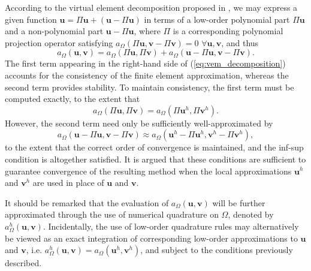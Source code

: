 	According to the virtual element decomposition proposed in \cite{Veiga:13}, we may express a given function $\mathbf{u} = \Pi \mathbf{u} + (\mathbf{u} - \Pi \mathbf{u})$ in terms of a low-order polynomial part $\Pi \mathbf{u}$ and a non-polynomial part $\mathbf{u} - \Pi \mathbf{u}$, where $\Pi$ is a corresponding polynomial projection operator satisfying $a_{\Omega}(\Pi \mathbf{u},\mathbf{v} - \Pi \mathbf{v}) = 0 \, \, \forall \mathbf{u}, \mathbf{v}$, and thus
	\begin{equation}
		a_{\Omega}(\mathbf{u},\mathbf{v}) = a_{\Omega}(\Pi \mathbf{u},\Pi \mathbf{v}) + a_{\Omega}(\mathbf{u} - \Pi \mathbf{u},\mathbf{v} - \Pi \mathbf{v}).
		\label{eq:vem_decomposition}
	\end{equation}
	The first term appearing in the right-hand side of (\ref{eq:vem_decomposition}) accounts for the consistency of the finite element approximation, whereas the second term provides stability. To maintain consistency, the first term must be computed exactly, to the extent that
	\begin{equation}
		a_{\Omega}(\Pi \mathbf{u},\Pi \mathbf{v}) = a_{\Omega}(\Pi \mathbf{u}^h,\Pi \mathbf{v}^h).
	\end{equation}	
	However, the second term need only be sufficiently well-approximated by
	\begin{equation}
		a_{\Omega}(\mathbf{u} - \Pi \mathbf{u},\mathbf{v} - \Pi \mathbf{v}) \approx a_{\Omega}(\mathbf{u}^h - \Pi \mathbf{u}^h,\mathbf{v}^h - \Pi \mathbf{v}^h),
	\end{equation}
	to the extent that the correct order of convergence is maintained, and the inf-sup condition is altogether satisfied. It is argued that these conditions are sufficient to guarantee convergence of the resulting method when the local approximations $\mathbf{u}^h$ and $\mathbf{v}^h$ are used in place of $\mathbf{u}$ and $\mathbf{v}$.
	
	It should be remarked that the evaluation of $a_{\Omega}(\mathbf{u},\mathbf{v})$ will be further approximated through the use of numerical quadrature on $\Omega$, denoted by $a^h_{\Omega}(\mathbf{u},\mathbf{v})$. Incidentally, the use of low-order quadrature rules may alternatively be viewed as an exact integration of corresponding low-order approximations to $\mathbf{u}$ and $\mathbf{v}$, i.e. $a^h_{\Omega}(\mathbf{u},\mathbf{v}) = a_{\Omega}(\mathbf{u}^h,\mathbf{v}^h)$, and subject to the conditions previously described.
	
